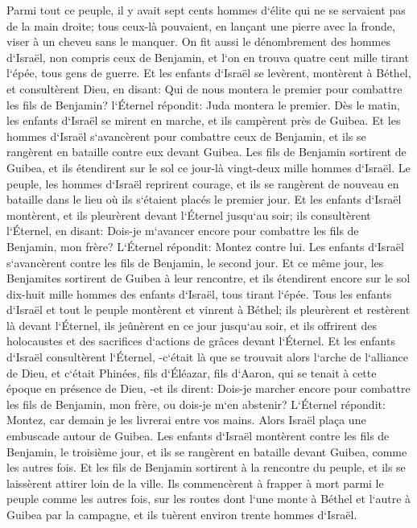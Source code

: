 \verse Parmi tout ce peuple, il y avait sept cents hommes d`élite qui ne se servaient pas de la main droite; tous ceux-là pouvaient, en lançant une pierre avec la fronde, viser à un cheveu sans le manquer. 
\verse On fit aussi le dénombrement des hommes d`Israël, non compris ceux de Benjamin, et l`on en trouva quatre cent mille tirant l`épée, tous gens de guerre. 
\verse Et les enfants d`Israël se levèrent, montèrent à Béthel, et consultèrent Dieu, en disant: Qui de nous montera le premier pour combattre les fils de Benjamin? l`Éternel répondit: Juda montera le premier. 
\verse Dès le matin, les enfants d`Israël se mirent en marche, et ils campèrent près de Guibea. 
\verse Et les hommes d`Israël s`avancèrent pour combattre ceux de Benjamin, et ils se rangèrent en bataille contre eux devant Guibea. 
\verse Les fils de Benjamin sortirent de Guibea, et ils étendirent sur le sol ce jour-là vingt-deux mille hommes d`Israël. 
\verse Le peuple, les hommes d`Israël reprirent courage, et ils se rangèrent de nouveau en bataille dans le lieu où ils s`étaient placés le premier jour. 
\verse Et les enfants d`Israël montèrent, et ils pleurèrent devant l`Éternel jusqu`au soir; ils consultèrent l`Éternel, en disant: Dois-je m`avancer encore pour combattre les fils de Benjamin, mon frère? L`Éternel répondit: Montez contre lui. 
\verse Les enfants d`Israël s`avancèrent contre les fils de Benjamin, le second jour. 
\verse Et ce même jour, les Benjamites sortirent de Guibea à leur rencontre, et ils étendirent encore sur le sol dix-huit mille hommes des enfants d`Israël, tous tirant l`épée. 
\verse Tous les enfants d`Israël et tout le peuple montèrent et vinrent à Béthel; ils pleurèrent et restèrent là devant l`Éternel, ils jeûnèrent en ce jour jusqu`au soir, et ils offrirent des holocaustes et des sacrifices d`actions de grâces devant l`Éternel. 
\verse Et les enfants d`Israël consultèrent l`Éternel, -c`était là que se trouvait alors l`arche de l`alliance de Dieu, 
\verse et c`était Phinées, fils d`Éléazar, fils d`Aaron, qui se tenait à cette époque en présence de Dieu, -et ils dirent: Dois-je marcher encore pour combattre les fils de Benjamin, mon frère, ou dois-je m`en abstenir? L`Éternel répondit: Montez, car demain je les livrerai entre vos mains. 
\verse Alors Israël plaça une embuscade autour de Guibea. 
\verse Les enfants d`Israël montèrent contre les fils de Benjamin, le troisième jour, et ils se rangèrent en bataille devant Guibea, comme les autres fois. 
\verse Et les fils de Benjamin sortirent à la rencontre du peuple, et ils se laissèrent attirer loin de la ville. Ils commencèrent à frapper à mort parmi le peuple comme les autres fois, sur les routes dont l`une monte à Béthel et l`autre à Guibea par la campagne, et ils tuèrent environ trente hommes d`Israël. 
